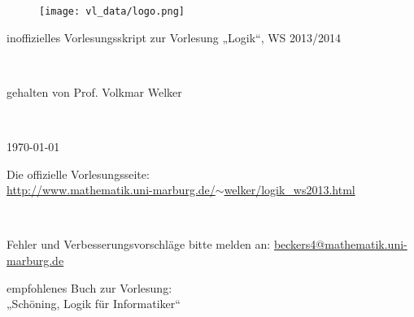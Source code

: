 \documentclass[a4paper, titlepage]{scrartcl}
\begin{document}


\begin{figure}[h]
\centering
\texttt{[image: vl\_data/logo.png]}
\end{figure}

\begin{center}
\begin{huge}inoffizielles Vorlesungsskript zur Vorlesung „Logik“, WS 2013/2014\end{huge}\\
\vspace{1cm}
\begin{large}gehalten von Prof. Volkmar Welker\end{large}\\
\vspace{1cm}
\begin{Large}\today \end{Large}
\end{center}

\noindent
\begin{center}
Die offizielle Vorlesungsseite:\\
\href{http://www.mathematik.uni-marburg.de/~welker/logik\_ws2013.html}{http://www.mathematik.uni-marburg.de/$\sim$welker/logik\_ws2013.html}
\end{center}

\noindent\\
\begin{center}\begin{Large}Fehler und Verbesserungsvorschläge bitte melden an: \href{mailto:beckers4@mathematik.uni-marburg.de}{beckers4@mathematik.uni-marburg.de}\end{Large}\end{center}
\vspace{1cm}
\begin{center}
empfohlenes Buch zur Vorlesung:\\
„Schöning, Logik für Informatiker“
\end{center}

\newpage

\tableofcontents

\newpage





\newpage


\end{document}
